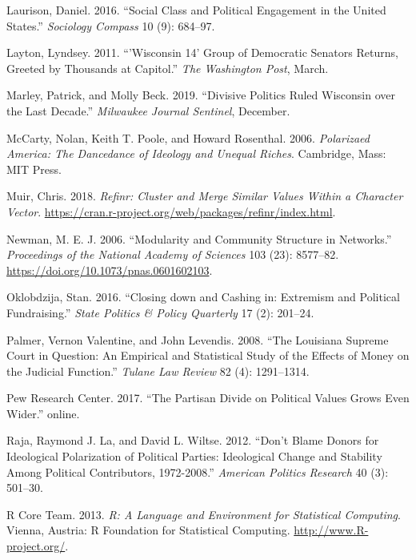 \documentclass[12pt,]{article}
\begin{document}
\leavevmode\hypertarget{ref-laurison2016}{}%
Laurison, Daniel. 2016. ``Social Class and Political Engagement in the
United States.'' \emph{Sociology Compass} 10 (9): 684--97.

\leavevmode\hypertarget{ref-layton2011}{}%
Layton, Lyndsey. 2011. ``'Wisconsin 14' Group of Democratic Senators
Returns, Greeted by Thousands at Capitol.'' \emph{The Washington Post},
March.

\leavevmode\hypertarget{ref-marley2019}{}%
Marley, Patrick, and Molly Beck. 2019. ``Divisive Politics Ruled
Wisconsin over the Last Decade.'' \emph{Milwaukee Journal Sentinel},
December.

\leavevmode\hypertarget{ref-mccarty2006}{}%
McCarty, Nolan, Keith T. Poole, and Howard Rosenthal. 2006.
\emph{Polarizaed America: The Dancedance of Ideology and Unequal
Riches}. Cambridge, Mass: MIT Press.

\leavevmode\hypertarget{ref-refinr}{}%
Muir, Chris. 2018. \emph{Refinr: Cluster and Merge Similar Values Within
a Character Vector}.
\url{https://cran.r-project.org/web/packages/refinr/index.html}.

\leavevmode\hypertarget{ref-newman2006}{}%
Newman, M. E. J. 2006. ``Modularity and Community Structure in
Networks.'' \emph{Proceedings of the National Academy of Sciences} 103
(23): 8577--82. \url{https://doi.org/10.1073/pnas.0601602103}.

\leavevmode\hypertarget{ref-oklobzija}{}%
Oklobdzija, Stan. 2016. ``Closing down and Cashing in: Extremism and
Political Fundraising.'' \emph{State Politics \& Policy Quarterly} 17
(2): 201--24.

\leavevmode\hypertarget{ref-palmer2008}{}%
Palmer, Vernon Valentine, and John Levendis. 2008. ``The Louisiana
Supreme Court in Question: An Empirical and Statistical Study of the
Effects of Money on the Judicial Function.'' \emph{Tulane Law Review} 82
(4): 1291--1314.

\leavevmode\hypertarget{ref-pew2017}{}%
Pew Research Center. 2017. ``The Partisan Divide on Political Values
Grows Even Wider.'' online.

\leavevmode\hypertarget{ref-laraja2011}{}%
Raja, Raymond J. La, and David L. Wiltse. 2012. ``Don't Blame Donors for
Ideological Polarization of Political Parties: Ideological Change and
Stability Among Political Contributors, 1972-2008.'' \emph{American
Politics Research} 40 (3): 501--30.

\leavevmode\hypertarget{ref-r}{}%
R Core Team. 2013. \emph{R: A Language and Environment for Statistical
Computing}. Vienna, Austria: R Foundation for Statistical Computing.
\url{http://www.R-project.org/}.
\end{document}
